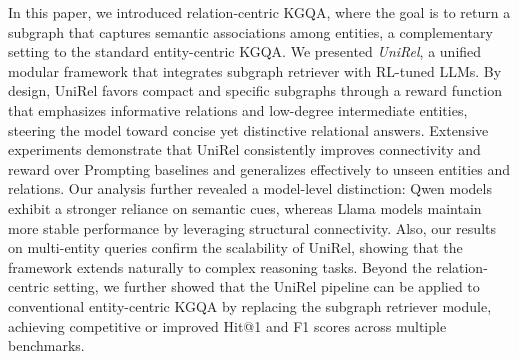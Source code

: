 In this paper, we introduced relation-centric KGQA, where the goal is to return a subgraph that captures semantic associations among entities, a complementary setting to the standard entity-centric KGQA. 
We presented \textit{UniRel}, a unified modular framework that integrates subgraph retriever with RL-tuned LLMs.
By design, UniRel favors compact and specific subgraphs through a reward function that emphasizes informative relations and low-degree intermediate entities, steering the model toward concise yet distinctive relational answers.
Extensive experiments demonstrate that UniRel consistently improves connectivity and reward over Prompting baselines and generalizes effectively to unseen entities and relations.
Our analysis further revealed a model-level distinction: Qwen models exhibit a stronger reliance on semantic cues, whereas Llama models maintain more stable performance by leveraging structural connectivity.
Also, our results on multi-entity queries confirm the scalability of UniRel, showing that the framework extends naturally to complex reasoning tasks.
Beyond the relation-centric setting, we further showed that the UniRel pipeline can be applied to conventional entity-centric KGQA by replacing the subgraph retriever module, achieving competitive or improved Hit@1 and F1 scores across multiple benchmarks.




